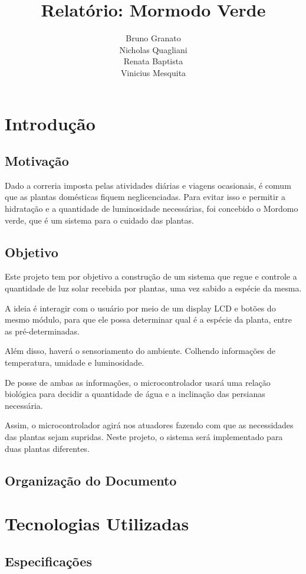 \documentclass[a4paper,12pt]{report}
\title{ Relatório: Mormodo Verde }
\author{Bruno Granato \\
	Nicholas Quagliani\\
	Renata Baptista\\
	Vinicius Mesquita}
\begin{document}
\maketitle


\tableofcontents
\chapter{Introdução}
	\section{Motivação}
		Dado a correria imposta pelas atividades diárias e viagens ocasionais, é comum que as plantas domésticas fiquem neglicenciadas. Para evitar isso e permitir a hidratação e a quantidade de luminosidade necessárias, foi concebido o Mordomo verde, que é um sistema para o cuidado das plantas.
	\section{Objetivo}
		Este projeto tem por objetivo a construção de um sistema que regue e controle a quantidade de luz solar recebida por plantas, uma vez sabido a espécie da mesma.
		
		A ideia é interagir com o usuário por meio de um display LCD e botões do mesmo módulo, para que ele possa determinar qual é a espécie da planta, entre as pré-determinadas. 
		
		Além disso, haverá o sensoriamento do ambiente. Colhendo informações de temperatura, umidade e luminosidade.
		
		De posse de ambas as informações, o microcontrolador usará uma relação biológica para decidir a quantidade de água e a inclinação das persianas necessária. 
		
		Assim, o microcontrolador agirá nos atuadores fazendo com que as necessidades das plantas sejam supridas. Neste projeto, o sistema será implementado para duas plantas diferentes.
	\section{Organização do Documento}

\chapter{Tecnologias Utilizadas}
	\section{Especificações}
	
\end{document}
